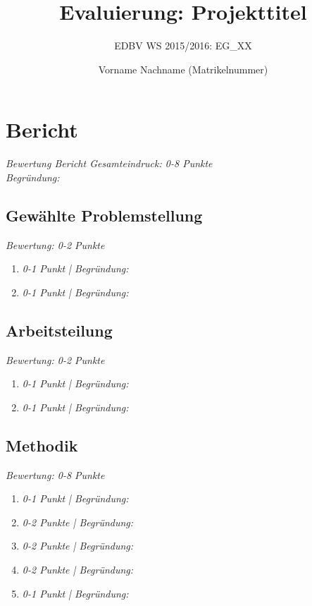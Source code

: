 \documentclass[deutsch, paper=a4]{scrartcl}
\begin{document}

\title{Evaluierung: Projekttitel} %

\subtitle{EDBV WS 2015/2016: EG\_XX} %


\author{Vorname Nachname (Matrikelnummer)}




\maketitle


\section{Bericht}
\textit{Bewertung Bericht Gesamteindruck: 0-8 Punkte\\ 
Begründung: }
\subsection{Gewählte Problemstellung}
\textit{Bewertung: 0-2 Punkte}\\
\begin{enumerate}[label=\alph*)]
\item \textit{0-1 Punkt | Begründung: }
\item \textit{0-1 Punkt | Begründung: }
\end{enumerate}

\subsection{Arbeitsteilung}
\textit{Bewertung: 0-2 Punkte}\\
\begin{enumerate}[label=\alph*)]
\item \textit{0-1 Punkt | Begründung: }
\item \textit{0-1 Punkt | Begründung: }
\end{enumerate}

\subsection{Methodik}
\textit{Bewertung: 0-8 Punkte}\\
\begin{enumerate}[label=\alph*)]
\item \textit{0-1 Punkt | Begründung: }
\item \textit{0-2 Punkte | Begründung: }
\item \textit{0-2 Punkte | Begründung: }
\item \textit{0-2 Punkte | Begründung: }
\item \textit{0-1 Punkt | Begründung: }
\end{enumerate}
\end{document}
